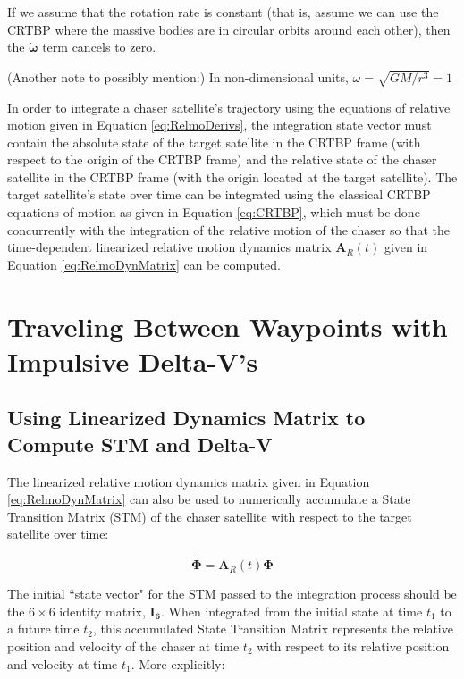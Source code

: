 \documentclass[]{article}
\begin{document}
If we assume that the rotation rate is constant (that is, assume we can use the CRTBP where the massive bodies are in circular orbits around each other), then the \(\boldsymbol{\dot{\omega}}\) term cancels to zero.

(Another note to possibly mention:) In non-dimensional units, \(\omega = \sqrt{GM/r^3} = 1\)

In order to integrate a chaser satellite's trajectory using the equations of relative motion given in Equation \ref{eq:RelmoDerivs}, the integration state vector must contain the absolute state of the target satellite in the CRTBP frame (with respect to the origin of the CRTBP frame) and the relative state of the chaser satellite in the CRTBP frame (with the origin located at the target satellite).  The target satellite's state over time can be integrated using the classical CRTBP equations of motion as given in Equation \ref{eq:CRTBP}, which must be done concurrently with the integration of the relative motion of the chaser so that the time-dependent linearized relative motion dynamics matrix \(\mathbf{A}_R(t)\) given in Equation \ref{eq:RelmoDynMatrix} can be computed.

\section{Traveling Between Waypoints with Impulsive Delta-V's}

\subsection{Using Linearized Dynamics Matrix to Compute STM and Delta-V}

The linearized relative motion dynamics matrix given in Equation \ref{eq:RelmoDynMatrix} can also be used to numerically accumulate a State Transition Matrix (STM) of the chaser satellite with respect to the target satellite over time:

\begin{equation} \label{eq:STM}
\dot{\boldsymbol{\Phi}} = \mathbf{A}_R(t)\boldsymbol{\Phi}
\end{equation}

The initial ``state vector" for the STM passed to the integration process should be the \(6\times6\) identity matrix, \(\mathbf{I_6}\).  When integrated from the initial state at time \(t_1\) to a future time \(t_2\), this accumulated State Transition Matrix represents the relative position and velocity of the chaser at time \(t_2\) with respect to its relative position and velocity at time \(t_1\).  More explicitly:
\end{document}
